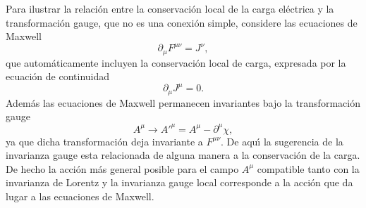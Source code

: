 Para ilustrar la relaci\'on entre la conservaci\'on local de la carga el\'ectrica y la transformaci\'on gauge, que no es una conexi\'on simple, considere las ecuaciones de Maxwell
\begin{equation}
    \partial_\mu F^{\mu\nu}=J^\nu,
\end{equation}
que autom\'aticamente incluyen la conservaci\'on local de carga, expresada por la ecuaci\'on de continuidad
\begin{equation}
  \partial_\mu J^\mu=0.  
\end{equation}
Adem\'as las ecuaciones de Maxwell permanecen invariantes bajo la transformaci\'on gauge
\begin{equation}
   A^\mu\to {A'}^\mu=A^\mu-\partial^\mu\chi,
\end{equation}
ya que dicha transformaci\'on deja invariante a $F^{\mu\nu}$. De aqu\'\i{} la sugerencia de la invarianza gauge esta relacionada de alguna manera a la conservaci\'on de la carga. De hecho la acci\'on m\'as general posible para el campo $A^\mu$ compatible tanto con la invarianza de Lorentz y la invarianza gauge local corresponde a la acci\'on que da lugar a las ecuaciones de Maxwell.



